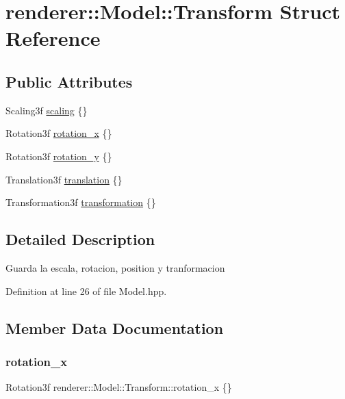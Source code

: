\hypertarget{structrenderer_1_1_model_1_1_transform}{}\section{renderer\+::Model\+::Transform Struct Reference}
\label{structrenderer_1_1_model_1_1_transform}
\subsection*{Public Attributes}
\begin{DoxyCompactItemize}
\item 
Scaling3f \mbox{\hyperlink{structrenderer_1_1_model_1_1_transform_aab3674b1b27fbf0f91acfa690ae97744}{scaling}} \{\}
\item 
Rotation3f \mbox{\hyperlink{structrenderer_1_1_model_1_1_transform_a2ba93f232da36e9c32977c82323cfbf0}{rotation\+\_\+x}} \{\}
\item 
Rotation3f \mbox{\hyperlink{structrenderer_1_1_model_1_1_transform_a3b4a43ef622b54f8d4d432bacfd1a52f}{rotation\+\_\+y}} \{\}
\item 
Translation3f \mbox{\hyperlink{structrenderer_1_1_model_1_1_transform_ad2274abae9bed064000673eb37d3f742}{translation}} \{\}
\item 
Transformation3f \mbox{\hyperlink{structrenderer_1_1_model_1_1_transform_a23b32f9024b97b529d1febaec190e997}{transformation}} \{\}
\end{DoxyCompactItemize}


\subsection{Detailed Description}
Guarda la escala, rotacion, position y tranformacion 

Definition at line 26 of file Model.\+hpp.



\subsection{Member Data Documentation}
\mbox{\label{structrenderer_1_1_model_1_1_transform_a2ba93f232da36e9c32977c82323cfbf0}} 
\subsubsection{\texorpdfstring{rotation\_x}{rotation\_x}}
{\footnotesize\ttfamily Rotation3f renderer\+::\+Model\+::\+Transform\+::rotation\+\_\+x \{\}}

